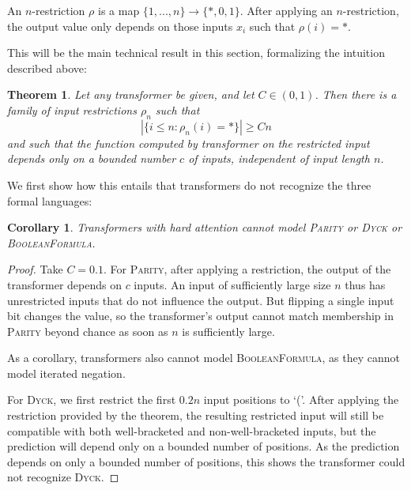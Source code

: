 \documentclass[11pt,a4paper]{article}
\newcounter{theorem}
\newtheorem{corollary}[theorem]{Corollary}
\newtheorem{thm}[theorem]{Theorem}
\begin{document}
An $n$-restriction $\rho$ is a map $\{1, ..., n\} \rightarrow \{*, 0, 1\}$.
After applying an $n$-restriction, the output value only depends on those inputs $x_i$ such that $\rho(i) = *$.

This will be the main technical result in this section, formalizing the intuition described above:
\begin{thm}\label{thm:hardmax-main}
Let any transformer be given, and let $C \in (0,1)$.
Then there is a family of input restrictions $\rho_n$ such that 
$$|\{i \leq n: \rho_n(i) = *\}| \geq Cn$$
and such that the function computed by transformer on the restricted input depends only on a bounded number $c$ of inputs, independent of input length $n$.
\end{thm}
We first show how this entails that transformers do not recognize the three formal languages:
\begin{corollary}
Transformers with hard attention cannot model \textsc{Parity} or \textsc{Dyck} or \textsc{BooleanFormula}.
\end{corollary}
\begin{proof}
Take $C=0.1$.
For \textsc{Parity}, after applying a restriction, the output of the transformer depends on $c$ inputs.
An input of sufficiently large size $n$ thus has unrestricted inputs that do not influence the output.
But flipping a single input bit changes the value, so the transformer's output cannot match membership in \textsc{Parity} beyond chance as soon as $n$ is sufficiently large.

As a corollary, transformers also cannot model \textsc{BooleanFormula}, as they cannot model iterated negation.

For \textsc{Dyck}, we first restrict the first $0.2n$ input positions to `('.
After applying the restriction provided by the theorem, the resulting restricted input will still be compatible with both well-bracketed and non-well-bracketed inputs, but the prediction will depend only on a bounded number of positions.
As the prediction depends on only a bounded number of positions, this shows the transformer could not recognize \textsc{Dyck}.



%
\end{proof}
\end{document}
